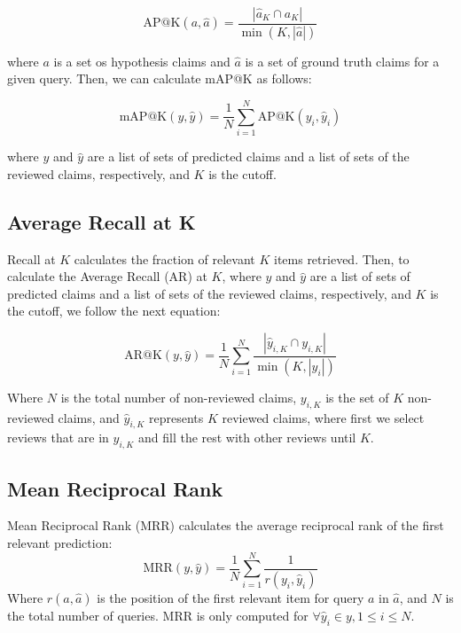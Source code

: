 \documentclass{article}
\begin{document}
\begin{equation}
\text{AP@K}(a,\hat{a}) = \frac{|\hat{a}_K \cap a_K|}{\min(K, |\hat{a}|)}
\end{equation}

where $a$ is a set os hypothesis claims and $\hat{a}$ is a set of ground truth claims for a given query.
Then, we can calculate mAP@K as follows:

\begin{equation}
\text{mAP@K}(y,\hat{y}) = \frac{1}{N} \sum_{i=1}^{N} \text{AP@K}(y_i,\hat{y}_i)
\end{equation}

where $y$ and $\hat{y}$ are a list of sets of predicted claims and a list of sets of the reviewed claims, respectively, and $K$ is the cutoff.

\subsection{Average Recall at K}
Recall at $K$ calculates the fraction of relevant $K$ items retrieved. Then, to calculate the Average Recall (AR) at $K$, where $y$ and $\hat{y}$ are a list of sets of predicted claims and a list of sets of the reviewed claims, respectively, and $K$ is the cutoff, we follow the next equation:

\begin{equation}
\text{AR@K}(y,\hat{y}) = \frac{1}{N}\sum_{i=1}^{N}{\frac{|\hat{y}_{i,K} \cap y_{i,K}|}{\min(K, |y_i|)}}
\end{equation}

Where $N$ is the total number of non-reviewed claims, $y_{i,K}$ is the set of $K$ non-reviewed claims,
and $\hat{y}_{i,K}$ represents $K$ reviewed claims, where first we select reviews that are in $y_{i,K}$ and fill the rest with other reviews until $K$.

\subsection{Mean Reciprocal Rank}
Mean Reciprocal Rank (MRR) calculates the average reciprocal rank of the first relevant prediction:
\begin{equation}
\text{MRR}(y,\hat{y}) = \frac{1}{N} \sum_{i=1}^{N} \frac{1}{r(y_i, \hat{y}_i)}
\end{equation}
Where $r(a, \hat{a})$ is the position of the first relevant item for query $a$ in $\hat{a}$, and $N$ is the total number of queries. MRR is only computed for $\forall \hat{y}_i \in y, 1 \leq i \leq N$.
\end{document}
